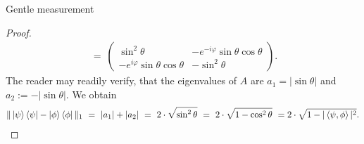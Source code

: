 \begin{subsubsection}{Gentle measurement}
\begin{proof}
\begin{align*}
         \ = \ \left(\begin{array}{cc} \sin^2\theta & - e^{-i\varphi} \sin\theta\cos\theta \\
        - e^{i \varphi} \sin \theta \cos \theta & - \sin^2 \theta \end{array}\right).
      \end{align*}
     The reader may readily verify, that the eigenvalues of $A$ are $a_1 = |\sin \theta|$ and $a_2 := -|\sin \theta|$. We obtain
     \begin{align}
      \|\ket{\psi}\bra{\psi} - \ket{\phi}\bra{\phi}\|_1 \ = \ |a_1| + |a_2|  \ = \ 2 \cdot \sqrt{\sin^2 \theta}  \ =\  2 \cdot \sqrt{1 - \cos^2 \theta} \ = 2 \cdot \sqrt{1 - |\braket{\psi,\phi}|^2}.
     \end{align}
     \end{proof}
     

\end{subsubsection}
